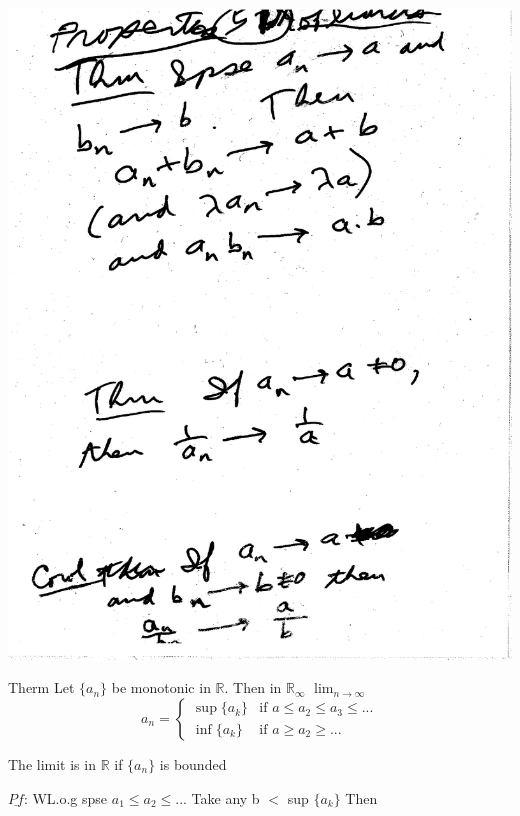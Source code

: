 \documentclass[10pt,a4paper]{article}
\begin{document}
{{\includegraphics[scale=.5]{Pages/LC_51}

Therm Let $\{ a_n \}$ be monotonic
in $\mathbb{R}$. Then in $\mathbb{R}_{\infty}$
$\lim_{n \rightarrow{\infty}}$
$$a_n = \begin{cases} 
\sup \{ a_k \} & \mbox{if } a \leq a_2 \leq a_3 \leq...\\
\inf \{ a_k \} & \mbox{if } a\geq a_2 \geq...
\end{cases}$$

The limit is in  $\mathbb{R}$ if $\{ a_n \}$ is bounded


$\underline{Pf}$: WL.o.g spse  $a_1 \leq a_2 \leq ...$ Take any b $<$ sup $\{ a_k \}$ Then 

}}
\end{document}

